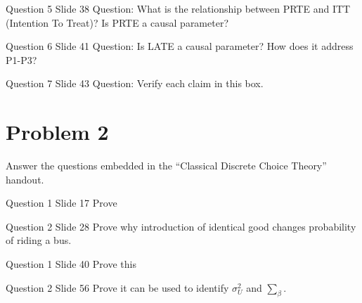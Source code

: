 \documentclass{article}
\begin{document}
\begin{problem}{Question 5 Slide 38}
Question: What is the relationship between PRTE and ITT (Intention To Treat)? Is PRTE a causal parameter?
\end{problem}
\begin{solution}
\end{solution}


\begin{problem}{Question 6 Slide 41}
Question: Is LATE a causal parameter? How does it address P1-P3?
\end{problem}
\begin{solution}
\end{solution}


\begin{problem}{Question 7 Slide 43}
Question: Verify each claim in this box.
\end{problem}
\begin{solution}
\end{solution}



\newpage
\section*{Problem 2}
Answer the questions embedded in the ``Classical Discrete Choice Theory'' handout.

\begin{problem}{Question 1 Slide 17}
Prove
\end{problem}
\begin{solution}
\end{solution}

\begin{problem}{Question 2 Slide 28}
Prove why introduction of identical good changes probability of riding a bus.
\end{problem}
\begin{solution}
\end{solution}


\begin{problem}{Question 1 Slide 40}
Prove this
\end{problem}
\begin{solution}
\end{solution}

\begin{problem}{Question 2 Slide 56}
Prove it can be used to identify $\sigma_{U}^{2}$ and $\sum_{\beta}$.
\end{problem}
\begin{solution}
\end{solution}
\end{document}
